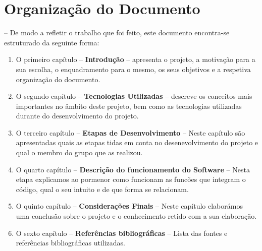 \section{Organização do Documento} -- 
\label{sec:organ}
De modo a refletir o trabalho que foi feito, este documento encontra-se estruturado da seguinte forma:
\begin{enumerate}
\item O primeiro capítulo -- \textbf{Introdução} -- apresenta o projeto, a motivação para a sua escolha, o enquadramento para o mesmo, os seus objetivos e a respetiva organização do documento.
\item O segundo capítulo -- \textbf{Tecnologias Utilizadas} -- descreve os conceitos mais importantes no âmbito deste projeto, bem como as tecnologias utilizadas durante do desenvolvimento do projeto.
\item O terceiro capítulo -- \textbf{Etapas de Desenvolvimento} -- Neste capítulo são apresentadas quais as etapas tidas em conta no desenevolvimento do projeto e qual o membro do grupo que as realizou.
\item O quarto capítulo -- \textbf{Descrição do funcionamento do Software} -- Nesta etapa explicamos ao pormenor como funcionam as funcões que integram o código, qual o seu intuito e de que forma se relacionam.
\item O quinto capítulo -- \textbf{Considerações Finais} -- Neste capítulo elaborámos uma conclusão sobre o projeto e o conhecimento retido com a sua elaboração.
\item O sexto capítulo -- \textbf{Referências bibliográficas} -- Lista das fontes e referências bibliográficas utilizadas.
\end{enumerate}
